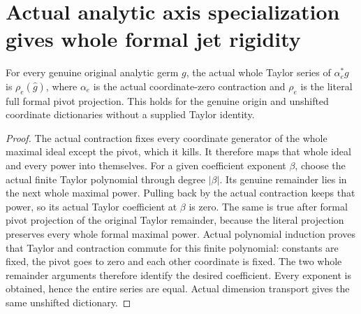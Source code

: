 \section{Actual analytic axis specialization gives whole formal jet rigidity}

\begin{theorem}
\label{hir:actual-whole-taylor-axis-zero-dictionary}
\leanok
For every genuine original analytic germ $g$, the actual whole Taylor
series of $\alpha_e^*g$ is $\rho_e(\widehat g)$, where $\alpha_e$
is the actual coordinate-zero contraction and $\rho_e$ is the literal
full formal pivot projection. This holds for the genuine origin and
unshifted coordinate dictionaries without a supplied Taylor identity.
\end{theorem}
\begin{proof}
The actual contraction fixes every coordinate generator of the whole
maximal ideal except the pivot, which it kills. It therefore maps
that whole ideal and every power into themselves. For a given
coefficient exponent $\beta$, choose the actual finite Taylor
polynomial through degree $|\beta|$. Its genuine remainder lies in
the next whole maximal power. Pulling back by the actual contraction
keeps that power, so its actual Taylor coefficient at $\beta$ is
zero. The same is true after formal pivot projection of the original
Taylor remainder, because the literal projection preserves every
whole formal maximal power. Actual polynomial induction proves that
Taylor and contraction commute for this finite polynomial: constants
are fixed, the pivot goes to zero and each other coordinate is fixed.
The two whole remainder arguments therefore identify the desired
coefficient. Every exponent is obtained, hence the entire series are
equal. Actual dimension transport gives the same unshifted dictionary.
\end{proof}

